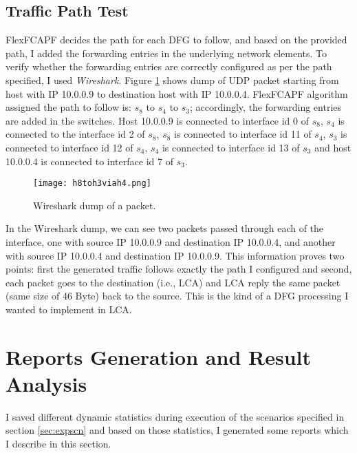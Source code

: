 \subsection{Traffic Path Test}
FlexFCAPF decides the path for each DFG to follow, and based on the provided path, I added the forwarding entries in the underlying network elements. To verify whether the forwarding entries are correctly configured as per the path specified, I used \textit{Wireshark}. Figure \ref{fig:trafficpath} shows dump of UDP packet starting from host with IP 10.0.0.9 to destination host with IP 10.0.0.4. FlexFCAPF algorithm assigned the path to follow is: $s_8$ to $s_4$ to $s_3$; accordingly, the forwarding entries are added in the switches. Host 10.0.0.9 is connected to interface id 0 of $s_8$, $s_4$ is connected to the interface id 2 of $s_8$, $s_8$ is connected to interface id 11 of $s_4$, $s_3$ is connected to interface id 12 of $s_4$, $s_4$ is connected to interface id 13 of $s_3$ and host 10.0.0.4 is connected to interface id 7 of $s_3$.

\begin{figure}[tb]
	\begin{center}
		\resizebox{\textwidth}{!}
		{\texttt{[image: h8toh3viah4.png]}}
		\caption{Wireshark dump of a packet.}
		\label{fig:trafficpath}
	\end{center}
\end{figure}
In the Wireshark dump, we can see two packets passed through each of the interface, one with source IP 10.0.0.9 and destination IP 10.0.0.4, and another with source IP 10.0.0.4 and destination IP 10.0.0.9. This information proves two points: first the generated traffic follows exactly the path I configured and second, each packet goes to the destination (i.e., LCA) and LCA reply the same packet (same size of 46 Byte) back to the source. This is the kind of a DFG processing I wanted to implement in LCA.

\section{Reports Generation and Result Analysis}\label{sec:rgra}
I saved different dynamic statistics during execution of the scenarios specified in section \ref{sec:expscn} and based on those statistics, I generated some reports which I describe in this section.

